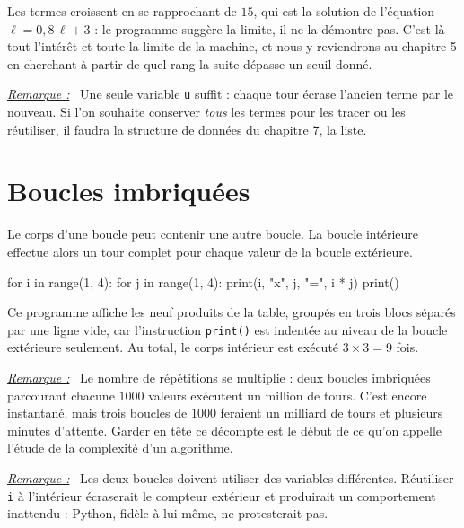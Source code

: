 \documentclass[a4paper,11pt,openany]{book}
\newcommand{\code}[1]{\texttt{\textcolor{codebleu}{#1}}}
\newenvironment{remarque}%
 {\par\vspace{1mm}\begin{list}{}{\leftmargin=1cm \rightmargin=0.5cm}\item[]%
  \textit{\underline{Remarque :}}~}%
 {\end{list}\vspace{1mm}}
\begin{document}
Les termes croissent en se rapprochant de $15$, qui est la solution de l'équation $\ell = 0{,}8\,\ell + 3$ : le programme suggère la limite, il ne la démontre pas. C'est là tout l'intérêt et toute la limite de la machine, et nous y reviendrons au chapitre 5 en cherchant à partir de quel rang la suite dépasse un seuil donné.

\begin{remarque}
Une seule variable \code{u} suffit : chaque tour écrase l'ancien terme par le nouveau. Si l'on souhaite conserver \emph{tous} les termes pour les tracer ou les réutiliser, il faudra la structure de données du chapitre 7, la liste.
\end{remarque}

\section{Boucles imbriquées}

Le corps d'une boucle peut contenir une autre boucle. La boucle intérieure effectue alors un tour complet pour chaque valeur de la boucle extérieure.

\begin{python}
for i in range(1, 4):
    for j in range(1, 4):
        print(i, "x", j, "=", i * j)
    print()
\end{python}

Ce programme affiche les neuf produits de la table, groupés en trois blocs séparés par une ligne vide, car l'instruction \code{print()} est indentée au niveau de la boucle extérieure seulement. Au total, le corps intérieur est exécuté $3 \times 3 = 9$ fois.

\begin{remarque}
Le nombre de répétitions se multiplie : deux boucles imbriquées parcourant chacune $1000$ valeurs exécutent un million de tours. C'est encore instantané, mais trois boucles de $1000$ feraient un milliard de tours et plusieurs minutes d'attente. Garder en tête ce décompte est le début de ce qu'on appelle l'étude de la complexité d'un algorithme.
\end{remarque}

\begin{remarque}
Les deux boucles doivent utiliser des variables différentes. Réutiliser \code{i} à l'intérieur écraserait le compteur extérieur et produirait un comportement inattendu : Python, fidèle à lui-même, ne protesterait pas.
\end{remarque}
\end{document}
